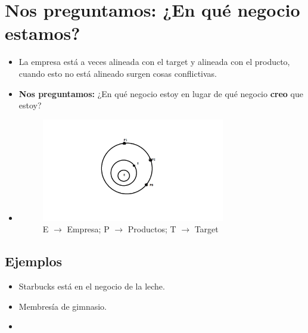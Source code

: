 \section{\textbf{Nos preguntamos:} ¿En qué negocio estamos?}
\begin{itemize}
    \item La empresa está a veces alineada con el target y alineada con el producto, cuando esto no está alineado surgen cosas conflictivas.
    \item \textbf{Nos preguntamos:} ¿En qué negocio estoy en lugar de qué negocio \textbf{creo} que estoy?
    \item \begin{figure}[htbp]
        \centering
        \includegraphics[width=8cm]{./../__Imagenes__/2020-01-21-MARKETING.png}
        \caption{E $\rightarrow$ Empresa; P $\rightarrow$ Productos; T $\rightarrow$ Target}
        \label{}
    \end{figure}
\end{itemize}


\subsection{Ejemplos}
\begin{itemize}
    \item Starbucks está en el negocio de la leche.
    \item Membresía de gimnasio.
    \item 
\end{itemize}
